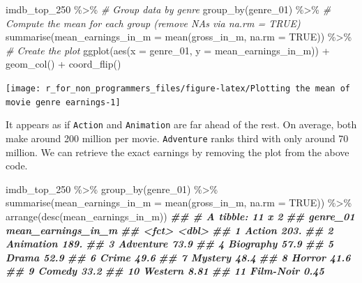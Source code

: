 \documentclass[
]{book}
\newenvironment{Shaded}{\begin{snugshade}}{\end{snugshade}}
\newcommand{\AttributeTok}[1]{\textcolor[rgb]{0.77,0.63,0.00}{#1}}
\newcommand{\CommentTok}[1]{\textcolor[rgb]{0.56,0.35,0.01}{\textit{#1}}}
\newcommand{\ConstantTok}[1]{\textcolor[rgb]{0.00,0.00,0.00}{#1}}
\newcommand{\DocumentationTok}[1]{\textcolor[rgb]{0.56,0.35,0.01}{\textbf{\textit{#1}}}}
\newcommand{\FunctionTok}[1]{\textcolor[rgb]{0.00,0.00,0.00}{#1}}
\newcommand{\NormalTok}[1]{#1}
\newcommand{\SpecialCharTok}[1]{\textcolor[rgb]{0.00,0.00,0.00}{#1}}
\begin{document}
\begin{Shaded}
\begin{Highlighting}[]
\NormalTok{imdb\_top\_250 }\SpecialCharTok{\%\textgreater{}\%} 
  \CommentTok{\# Group data by genre}
  \FunctionTok{group\_by}\NormalTok{(genre\_01) }\SpecialCharTok{\%\textgreater{}\%} 
  \CommentTok{\# Compute the mean for each group (remove NAs via na.rm = TRUE)}
  \FunctionTok{summarise}\NormalTok{(}\AttributeTok{mean\_earnings\_in\_m =} \FunctionTok{mean}\NormalTok{(gross\_in\_m, }\AttributeTok{na.rm =} \ConstantTok{TRUE}\NormalTok{)) }\SpecialCharTok{\%\textgreater{}\%} 
\CommentTok{\# Create the plot}
  \FunctionTok{ggplot}\NormalTok{(}\FunctionTok{aes}\NormalTok{(}\AttributeTok{x =}\NormalTok{ genre\_01, }\AttributeTok{y =}\NormalTok{ mean\_earnings\_in\_m)) }\SpecialCharTok{+}
  \FunctionTok{geom\_col}\NormalTok{() }\SpecialCharTok{+}
  \FunctionTok{coord\_flip}\NormalTok{()}
\end{Highlighting}
\end{Shaded}

\begin{center}\texttt{[image: r\_for\_non\_programmers\_files/figure-latex/Plotting the mean of movie genre earnings-1]} \end{center}

It appears as if \texttt{Action} and \texttt{Animation} are far ahead of the rest. On average, both make around 200 million per movie. \texttt{Adventure} ranks third with only around 70 million. We can retrieve the exact earnings by removing the plot from the above code.

\begin{Shaded}
\begin{Highlighting}[]
\NormalTok{imdb\_top\_250 }\SpecialCharTok{\%\textgreater{}\%} 
  \FunctionTok{group\_by}\NormalTok{(genre\_01) }\SpecialCharTok{\%\textgreater{}\%}
  \FunctionTok{summarise}\NormalTok{(}\AttributeTok{mean\_earnings\_in\_m =} \FunctionTok{mean}\NormalTok{(gross\_in\_m, }\AttributeTok{na.rm =} \ConstantTok{TRUE}\NormalTok{)) }\SpecialCharTok{\%\textgreater{}\%} 
  \FunctionTok{arrange}\NormalTok{(}\FunctionTok{desc}\NormalTok{(mean\_earnings\_in\_m))}
\DocumentationTok{\#\# \# A tibble: 11 x 2}
\DocumentationTok{\#\#    genre\_01  mean\_earnings\_in\_m}
\DocumentationTok{\#\#    \textless{}fct\textgreater{}                  \textless{}dbl\textgreater{}}
\DocumentationTok{\#\#  1 Action                203.  }
\DocumentationTok{\#\#  2 Animation             189.  }
\DocumentationTok{\#\#  3 Adventure              73.9 }
\DocumentationTok{\#\#  4 Biography              57.9 }
\DocumentationTok{\#\#  5 Drama                  52.9 }
\DocumentationTok{\#\#  6 Crime                  49.6 }
\DocumentationTok{\#\#  7 Mystery                48.4 }
\DocumentationTok{\#\#  8 Horror                 41.6 }
\DocumentationTok{\#\#  9 Comedy                 33.2 }
\DocumentationTok{\#\# 10 Western                 8.81}
\DocumentationTok{\#\# 11 Film{-}Noir               0.45}
\end{Highlighting}
\end{Shaded}
\end{document}

